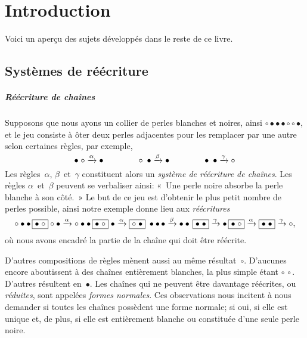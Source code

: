 \chapter{Introduction}
\setcounter{page}{1}

Voici un aperçu des sujets développés dans le reste de ce livre.

\section{Systèmes de réécriture}

\paragraph{Réécriture de chaînes}

Supposons que nous ayons un collier de perles blanches et noires,
ainsi \(\circ \bullet \bullet \bullet \circ \circ \bullet\), et le
jeu \citep{VanLeeuwen_1990a,Dershowitz_1993} consiste à ôter deux
perles adjacentes pour les remplacer par une autre selon certaines
règles, par exemple,
\begin{equation*}
\bullet \; \circ   \xrightarrow{\smash{\alpha}} \bullet\qquad\qquad
\circ   \; \bullet \xrightarrow{\smash{\beta}} \bullet\qquad\qquad
\bullet \; \bullet \xrightarrow{\smash{\gamma}} \circ
\end{equation*}
Les règles~\(\alpha\), \(\beta\)~et~\(\gamma\) constituent alors un
\emph{système de réécriture de chaînes}. Les règles \(\alpha\)~et~\(\beta\) peuvent se
verbaliser ainsi: «~Une perle noire absorbe la perle blanche à son
côté.~» Le but de ce jeu est d'obtenir le plus petit nombre de perles
possible, ainsi notre exemple donne lieu aux \emph{réécritures}
\begin{equation*}
\circ \bullet \bullet \, \fbox{\(\bullet\; \circ\)} \circ \bullet
\xrightarrow{\smash{\alpha}} \circ \bullet \bullet \,
\fbox{\(\bullet\; \circ\)} \; \bullet \xrightarrow{\smash{\alpha}}
\fbox{\(\circ \; \bullet\)} \; \bullet \bullet \,\bullet
\xrightarrow{\smash{\beta}} \bullet \bullet \, \fbox{\(\bullet \;
  \bullet\)} \xrightarrow{\smash{\gamma}} \bullet \, \fbox{\(\bullet
  \; \circ\)} \xrightarrow{\smash{\alpha}} \fbox{\(\bullet \;
  \bullet\)} \xrightarrow{\smash{\gamma}} \circ,
\end{equation*}
où nous avons encadré la partie de la chaîne qui doit être réécrite.

D'autres compositions de règles mènent aussi au même
résultat~\(\circ\). D'aucunes encore aboutissent à des chaînes
entièrement blanches, la plus simple étant \(\circ \,
\circ\). D'autres résultent en~\(\bullet\). Les chaînes qui ne peuvent
être davantage réécrites, ou \emph{réduites}, sont appelées
\emph{formes normales}. Ces
observations nous incitent à nous demander si toutes les chaînes
possèdent une forme normale; si oui, si elle est unique et, de plus,
si elle est entièrement blanche ou constituée d'une seule perle noire.

